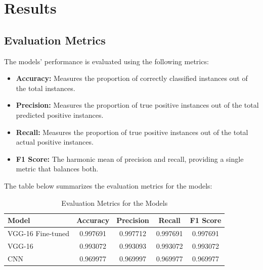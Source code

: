 \chapter{Results}  %

\section{Evaluation Metrics}

The models' performance is evaluated using the following metrics:

\begin{itemize}
    \item \textbf{Accuracy:} Measures the proportion of correctly classified instances out of the total instances.
    \item \textbf{Precision:} Measures the proportion of true positive instances out of the total predicted positive instances.
    \item \textbf{Recall:} Measures the proportion of true positive instances out of the total actual positive instances.
    \item \textbf{F1 Score:} The harmonic mean of precision and recall, providing a single metric that balances both.
\end{itemize}

The table below summarizes the evaluation metrics for the models:

\begin{table}[htbp]
  \centering
  \caption{Evaluation Metrics for the Models}
  \vspace{0.5cm}  %
  \begin{tabular}{@{\hskip 5pt} l @{\hskip 10pt} c @{\hskip 10pt} c @{\hskip 10pt} c @{\hskip 10pt} c @{\hskip 5pt}}
  \toprule
  \textbf{Model} & \textbf{Accuracy} & \textbf{Precision} & \textbf{Recall} & \textbf{F1 Score} \\
  \midrule
  VGG-16 Fine-tuned  & 0.997691 & 0.997712 & 0.997691 & 0.997691 \\
  VGG-16  & 0.993072 & 0.993093 & 0.993072 & 0.993072 \\
  CNN        & 0.969977 & 0.969997 & 0.969977 & 0.969977 \\
  \bottomrule
  \end{tabular}
\end{table}
\newpage %

